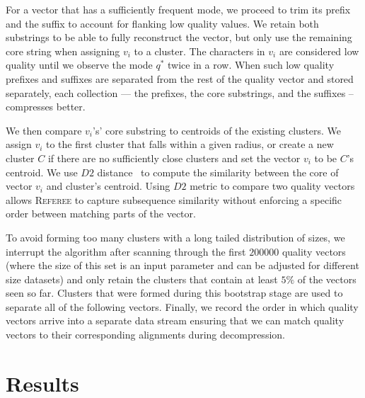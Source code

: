 \documentclass[12pt]{cmuthesis}
\newcommand{\refer}{\textsc{Referee}\xspace}
\begin{document}
  For a vector that has a sufficiently frequent mode, we proceed to trim its prefix and the suffix to account for flanking low quality values. We retain both substrings to be able to fully reconstruct the vector, but only use the remaining core string when assigning $v_i$ to a cluster. The characters in $v_i$ are considered low quality until we observe the mode $q^*$ twice in a row. When such low quality prefixes and suffixes are separated from the rest of the quality vector and stored separately, each collection --- the prefixes, the core substrings, and the suffixes -- compresses better.

  We then compare $v_i$'s' core substring to centroids of the existing clusters. We assign $v_i$ to the first cluster that falls within a given radius, or create a new cluster $C$ if there are no sufficiently close clusters and set the vector $v_i$ to be $C$'s centroid. We use $D2$ distance~\cite{D2Dist} to compute the similarity between the core of vector $v_i$ and cluster's centroid. Using $D2$ metric to compare two quality vectors allows \refer to capture subsequence similarity without enforcing a specific order between matching parts of the vector.

  To avoid forming too many clusters with a long tailed distribution of sizes, we interrupt the algorithm after scanning through the first $200000$ quality vectors (where the size of this set is an input parameter and can be adjusted for different size datasets) and only retain the clusters that contain at least $5\%$ of the vectors seen so far. Clusters that were formed during this bootstrap stage are used to separate all of the following vectors. Finally, we record the order in which quality vectors arrive into a separate data stream ensuring that we can match quality vectors to their corresponding alignments during decompression.


\section{Results}
\end{document}
